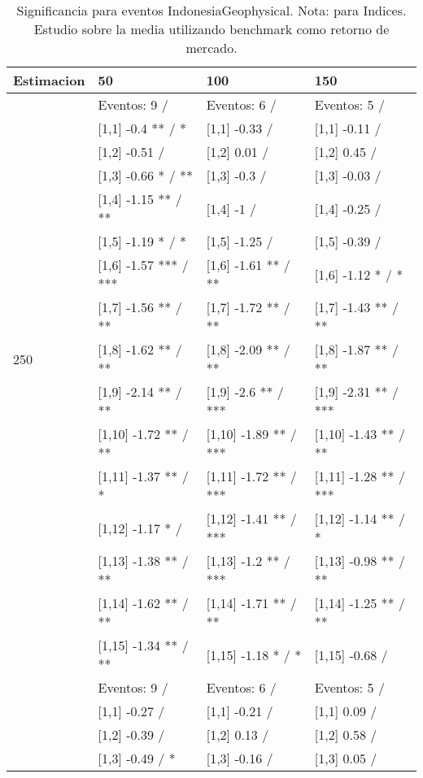 \begin{table}

\caption{Significancia para eventos IndonesiaGeophysical. Nota: para Indices. Estudio sobre la media utilizando benchmark como retorno de mercado.}
\centering
\begin{tabular}[t]{llll}
\toprule
Estimacion & 50 & 100 & 150\\
\midrule
 & Eventos:  9 / & Eventos:  6 / & Eventos:  5 /\\
 & {}[1,1] -0.4 ** / * & {}[1,1] -0.33  / & {}[1,1] -0.11  /\\
 & {}[1,2] -0.51  / & {}[1,2] 0.01  / & {}[1,2] 0.45  /\\
 & {}[1,3] -0.66 * / ** & {}[1,3] -0.3  / & {}[1,3] -0.03  /\\
 & {}[1,4] -1.15 ** / ** & {}[1,4] -1  / & {}[1,4] -0.25  /\\
\addlinespace
 & {}[1,5] -1.19 * / * & {}[1,5] -1.25  / & {}[1,5] -0.39  /\\
 & {}[1,6] -1.57 *** / *** & {}[1,6] -1.61 ** / ** & {}[1,6] -1.12 * / *\\
 & {}[1,7] -1.56 ** / ** & {}[1,7] -1.72 ** / ** & {}[1,7] -1.43 ** / **\\
250 & {}[1,8] -1.62 ** / ** & {}[1,8] -2.09 ** / ** & {}[1,8] -1.87 ** / **\\
 & {}[1,9] -2.14 ** / ** & {}[1,9] -2.6 ** / *** & {}[1,9] -2.31 ** / ***\\
\addlinespace
 & {}[1,10] -1.72 ** / ** & {}[1,10] -1.89 ** / *** & {}[1,10] -1.43 ** / **\\
 & {}[1,11] -1.37 ** / * & {}[1,11] -1.72 ** / *** & {}[1,11] -1.28 ** / ***\\
 & {}[1,12] -1.17 * / & {}[1,12] -1.41 ** / *** & {}[1,12] -1.14 ** / *\\
 & {}[1,13] -1.38 ** / ** & {}[1,13] -1.2 ** / *** & {}[1,13] -0.98 ** / **\\
 & {}[1,14] -1.62 ** / ** & {}[1,14] -1.71 ** / ** & {}[1,14] -1.25 ** / **\\
\addlinespace
 & {}[1,15] -1.34 ** / ** & {}[1,15] -1.18 * / * & {}[1,15] -0.68  /\\
 & Eventos:  9 / & Eventos:  6 / & Eventos:  5 /\\
 & {}[1,1] -0.27  / & {}[1,1] -0.21  / & {}[1,1] 0.09  /\\
 & {}[1,2] -0.39  / & {}[1,2] 0.13  / & {}[1,2] 0.58  /\\
 & {}[1,3] -0.49  / * & {}[1,3] -0.16  / & {}[1,3] 0.05  /\\

\end{tabular}
\end{table}
